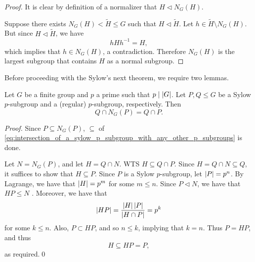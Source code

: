 \documentclass[notoc,notitlepage]{tufte-book}
\begin{document}
\begin{proof}
  It is clear by definition of a normalizer that $H \triangleleft N_G(H)$.

  Suppose there exists $N_G(H) < \tilde{H} \leq G$ such that
  $H \triangleleft \tilde{H}$. Let $h \in \tilde{H} \setminus N_G(H)$.
  But since $H \triangleleft \tilde{H}$, we have
  \begin{equation*}
    hHh^{-1} = H,
  \end{equation*}
  which implies that $h \in N_G(H)$, a contradiction.
  Therefore $N_G(H)$ is the largest subgroup that contains $H$ as a
  normal subgroup.
\end{proof}

Before proceeding with the Sylow's next theorem, we require two lemmas.

\begin{lemma}\label{lemma:intersection_of_a_sylow_p_subgroup_with_any_other_p_subgroups}
  Let $G$ be a finite group and $p$ a prime such that $p \mid \left|G\right|$.
  Let $P, Q \leq G$ be a Sylow $p$-subgroup and a (regular) $p$-subgroup,
  respectively. Then
  \begin{equation}\label{eq:intersection_of_a_sylow_p_subgroup_with_any_other_p_subgroups}
    Q \cap N_G(P) = Q \cap P.
  \end{equation}
\end{lemma}

\begin{proof}
  Since $P \subseteq N_G(P)$, $\subseteq$ of \cref{eq:intersection_of_a_sylow_p_subgroup_with_any_other_p_subgroups} is done.

  Let $N = N_G(P)$, and let $H = Q \cap N$. WTS $H \subseteq Q \cap P$.
  Since $H = Q \cap N \subseteq Q$, it suffices to show that $H \subseteq P$.
  Since $P$ is a Sylow $p$-subgroup, let $\left|P\right| = p^n$. By Lagrange,
  we have that $\left|H\right| = p^m$ for some $m \leq n$. Since $P \triangleleft N$,
  we have that $HP \leq N$ 
  .
  Moreover, we have that
  \begin{equation*}
    \left|HP\right| = \frac{\left|H\right|\left|P\right|}{\left|H \cap P\right|} = p^k
  \end{equation*}
  for some $k \leq n$. Also, $P \subset HP$, and so $n \leq k$,
  implying that $k = n$. Thus $P = HP$, and thus
  \begin{equation*}
    H \subseteq HP = P,
  \end{equation*}
  as required.\qed\
\end{proof}
\end{document}
